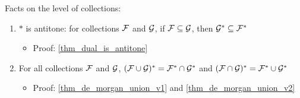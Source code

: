 Facts on the level of collections:
\begin{enumerate}
    \item $*$ is antitone: for collections $\mathcal{F}$ and $\mathcal{G}$, if $\mathcal{F} \subseteq \mathcal{G}$, then $\mathcal{G}^* \subseteq \mathcal{F}^*$
    \begin{itemize}
        \item Proof: \cref{thm_dual_is_antitone}
    \end{itemize}

    \item For all collections $\mathcal{F}$ and $\mathcal{G}$, $(\mathcal{F} \cup \mathcal{G})^* = \mathcal{F}^* \cap \mathcal{G}^*$ and $(\mathcal{F} \cap \mathcal{G})^* = \mathcal{F}^* \cup \mathcal{G}^*$
    \begin{itemize}
        \item Proof: \cref{thm_de_morgan_union_v1} and \cref{thm_de_morgan_union_v2}
    \end{itemize}
\end{enumerate}

\vskip0.5cm

